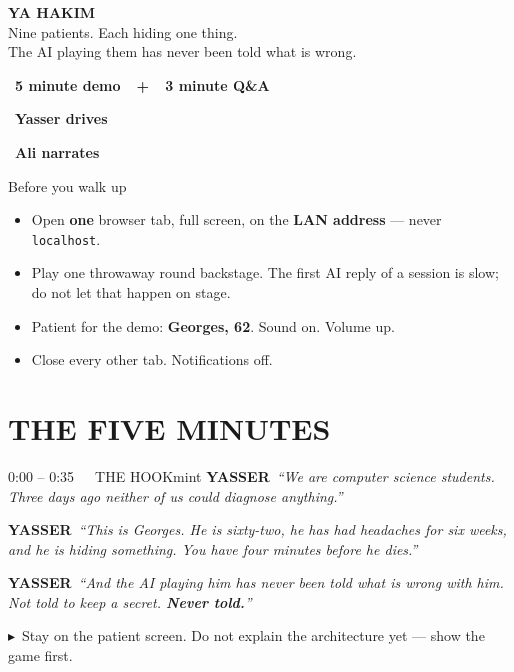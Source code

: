\documentclass[11pt,a4paper]{article}
\newcommand{\Y}{\textcolor{mintdeep}{\textbf{YASSER}}}
\newcommand{\say}[1]{\textit{``#1''}}
\newcommand{\act}[1]{\textcolor{inksoft}{\small$\blacktriangleright$~#1}}
\begin{document}
\begin{center}
{\Huge\bfseries YA HAKIM}\\[2.5mm]
{\large\textcolor{inksoft}{Nine patients. Each hiding one thing.}}\\[1.5mm]
{\large\textcolor{inksoft}{The AI playing them has never been told what is wrong.}}\\[4mm]
\colorbox{lemon}{\rule[-2.2mm]{0pt}{7mm}\ \textbf{5 minute demo\ \ +\ \ 3 minute Q\&A}\ }
\hspace{2mm}
\colorbox{mint}{\rule[-2.2mm]{0pt}{7mm}\ \textbf{Yasser drives}\ }
\hspace{2mm}
\colorbox{peri}{\rule[-2.2mm]{0pt}{7mm}\ \textbf{Ali narrates}\ }
\end{center}

\vspace{2mm}

\begin{panel}[lemon]{Before you walk up}
\begin{itemize}[leftmargin=5mm,itemsep=1.2mm,topsep=0.8mm]
  \item Open \textbf{one} browser tab, full screen, on the \textbf{LAN address} --- never \texttt{localhost}.
  \item Play one throwaway round backstage. The first AI reply of a session is slow; do not let that happen on stage.
  \item Patient for the demo: \textbf{Georges, 62}. Sound on. Volume up.
  \item Close every other tab. Notifications off.
\end{itemize}
\end{panel}

\section*{THE FIVE MINUTES}

\begin{beat}{0:00 -- 0:35\ \ \ THE HOOK}{mint}
\Y\ \say{We are computer science students. Three days ago neither of us could
diagnose anything.}\par\smallskip
\Y\ \say{This is Georges. He is sixty-two, he has had headaches for six weeks,
and he is hiding something. You have four minutes before he dies.}\par\smallskip
\Y\ \say{And the AI playing him has never been told what is wrong with him.
Not told to keep a secret. \textbf{Never told.}}\par\smallskip
\act{Stay on the patient screen. Do not explain the architecture yet --- show the game first.}
\end{beat}
\end{document}
